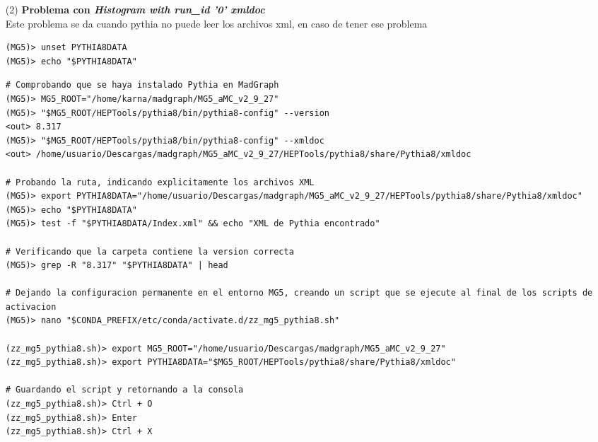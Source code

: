 \begin{itemize}
\begin{lstlisting}
(mg5_compiler.sh)> export MG5_ROOT="/home/usuario/Descargas/madgraph/MG5_aMC_v2_9_27"
(mg5_compiler.sh)> export LHAPDF_ROOT="$MG5_ROOT/HEPTools/lhapdf6_py3"
(mg5_compiler.sh)> export LD_LIBRARY_PATH="$LHAPDF_ROOT/lib${LD_LIBRARY_PATH:+:$LD_LIBRARY_PATH}"
(mg5_compiler.sh)> LHAPDF_PYTHON_PATH="$(find "$LHAPDF_ROOT" - type d -name "site-packages" -print -quit)"
(mg5_compiler.sh)> if [ -n "$LHAPDF_PYTHON_PATH" ]; then
(mg5_compiler.sh)>    export PYTHONPATH="$LHAPDF_PYTHON_PATH${PYTHONPATH:+:$PYTHONPATH}"
(mg5_compiler.sh)> fi
(mg5_compiler.sh)> unset LHAPDF_PYTHON_PATH    
\end{lstlisting}
    \item[(2)] \textbf{Problema con \textit{Histogram with run\_id '0' xmldoc}}\\
    Este problema se da cuando pythia no puede leer los archivos xml, en caso de tener ese problema
    \begin{lstlisting}
(MG5)> unset PYTHIA8DATA
(MG5)> echo "$PYTHIA8DATA"
\end{lstlisting}
    \newpage 
    \begin{lstlisting}  
# Comprobando que se haya instalado Pythia en MadGraph
(MG5)> MG5_ROOT="/home/karna/madgraph/MG5_aMC_v2_9_27"
(MG5)> "$MG5_ROOT/HEPTools/pythia8/bin/pythia8-config" --version
<out> 8.317
(MG5)> "$MG5_ROOT/HEPTools/pythia8/bin/pythia8-config" --xmldoc
<out> /home/usuario/Descargas/madgraph/MG5_aMC_v2_9_27/HEPTools/pythia8/share/Pythia8/xmldoc

# Probando la ruta, indicando explicitamente los archivos XML
(MG5)> export PYTHIA8DATA="/home/usuario/Descargas/madgraph/MG5_aMC_v2_9_27/HEPTools/pythia8/share/Pythia8/xmldoc"
(MG5)> echo "$PYTHIA8DATA"
(MG5)> test -f "$PYTHIA8DATA/Index.xml" && echo "XML de Pythia encontrado"

# Verificando que la carpeta contiene la version correcta
(MG5)> grep -R "8.317" "$PYTHIA8DATA" | head

# Dejando la configuracion permanente en el entorno MG5, creando un script que se ejecute al final de los scripts de activacion
(MG5)> nano "$CONDA_PREFIX/etc/conda/activate.d/zz_mg5_pythia8.sh"

(zz_mg5_pythia8.sh)> export MG5_ROOT="/home/usuario/Descargas/madgraph/MG5_aMC_v2_9_27"
(zz_mg5_pythia8.sh)> export PYTHIA8DATA="$MG5_ROOT/HEPTools/pythia8/share/Pythia8/xmldoc"

# Guardando el script y retornando a la consola
(zz_mg5_pythia8.sh)> Ctrl + O
(zz_mg5_pythia8.sh)> Enter
(zz_mg5_pythia8.sh)> Ctrl + X


\end{lstlisting}
\end{itemize}
